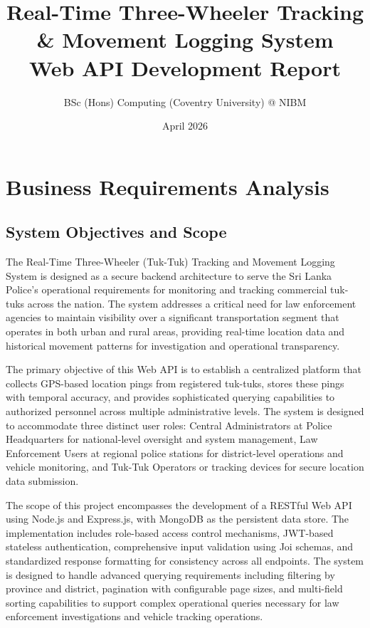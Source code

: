 \documentclass[12pt,a4paper]{article}
\title{\textbf{Real-Time Three-Wheeler Tracking \& Movement Logging System\\ 
Web API Development Report}}
\author{BSc (Hons) Computing (Coventry University) @ NIBM}
\date{April 2026}
\begin{document}
\maketitle
\newpage

\tableofcontents
\newpage

\section{Business Requirements Analysis}

\subsection{System Objectives and Scope}

The Real-Time Three-Wheeler (Tuk-Tuk) Tracking and Movement Logging System is designed as a secure backend architecture to serve the Sri Lanka Police's operational requirements for monitoring and tracking commercial tuk-tuks across the nation. The system addresses a critical need for law enforcement agencies to maintain visibility over a significant transportation segment that operates in both urban and rural areas, providing real-time location data and historical movement patterns for investigation and operational transparency.

The primary objective of this Web API is to establish a centralized platform that collects GPS-based location pings from registered tuk-tuks, stores these pings with temporal accuracy, and provides sophisticated querying capabilities to authorized personnel across multiple administrative levels. The system is designed to accommodate three distinct user roles: Central Administrators at Police Headquarters for national-level oversight and system management, Law Enforcement Users at regional police stations for district-level operations and vehicle monitoring, and Tuk-Tuk Operators or tracking devices for secure location data submission.

The scope of this project encompasses the development of a RESTful Web API using Node.js and Express.js, with MongoDB as the persistent data store. The implementation includes role-based access control mechanisms, JWT-based stateless authentication, comprehensive input validation using Joi schemas, and standardized response formatting for consistency across all endpoints. The system is designed to handle advanced querying requirements including filtering by province and district, pagination with configurable page sizes, and multi-field sorting capabilities to support complex operational queries necessary for law enforcement investigations and vehicle tracking operations.
\end{document}
